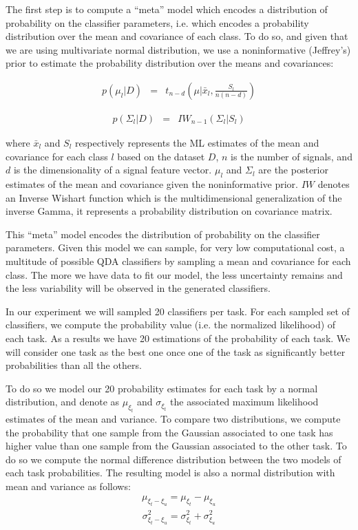 The first step is to compute a ``meta'' model which encodes a distribution of probability on the classifier parameters, i.e. which encodes a probability distribution over the mean and covariance of each class. To do so, and given that we are using multivariate normal distribution, we use a noninformative (Jeffrey's) prior \cite{gelman2003bayesian} to estimate the probability distribution over the means and covariances:

\begin{eqnarray}
p(\mu_l|D) & = & t_{n-d}(\mu| \bar{x}_l, \frac{S_l}{n(n-d)})
\label{eq:jeffreysmean}
\end{eqnarray}

\begin{eqnarray}
p(\Sigma_l|D) & = & IW_{n-1}(\Sigma_l | S_l)
\label{eq:jeffreyscov}
\end{eqnarray}

where $\bar{x}_l$ and $S_l$ respectively represents the ML estimates of the mean and covariance for each class $l$ based on the dataset $D$, $n$ is the number of signals, and $d$ is the dimensionality of a signal feature vector.
$\mu_l$ and $\Sigma_l$ are the posterior estimates of the mean and covariance given the noninformative prior. $IW$ denotes an Inverse Wishart function which is the multidimensional generalization of the inverse Gamma, it represents a probability distribution on covariance matrix.

This ``meta'' model encodes the distribution of probability on the classifier parameters. Given this model we can sample, for very low computational cost, a multitude of possible QDA classifiers by sampling a mean and covariance for each class. The more we have data to fit our model, the less uncertainty remains and the less variability will be observed in the generated classifiers. 

In our experiment we will sampled 20 classifiers per task. For each sampled set of classifiers, we compute the probability value (i.e. the normalized likelihood) of each task. As a results we have 20 estimations of the probability of each task. We will consider one task as the best one once one of the task as significantly better probabilities than all the others. 

To do so we model our 20 probability estimates for each task by a normal distribution, and denote as $\mu_{\xi_t}$ and $\sigma_{\xi_t}$ the associated maximum likelihood estimates of the mean and variance. To compare two distributions, we compute the probability that one sample from the  Gaussian associated to one task has higher value than one sample from the Gaussian associated to the other task. To do so we compute the normal difference distribution between the two models of each task probabilities. The resulting model is also a normal distribution with mean and variance as follows:
%
\begin{eqnarray}
\mu_{\xi_t - \xi_u} = \mu_{\xi_t} - \mu_{\xi_u} 
\label{eq:meandiffgaussian}
\end{eqnarray}
%
\begin{eqnarray}
\sigma^2_{\xi_t - \xi_u} = \sigma^2_{\xi_t} + \sigma^2_{\xi_u}
\label{eq:variancediffgaussian}
\end{eqnarray}

